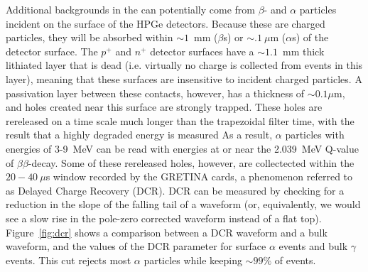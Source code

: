 \documentclass[/main.tex]{subfiles}
\begin{document}
Additional backgrounds in the \MJD can potentially come from $\beta$- and $\alpha$ particles incident on the surface of the HPGe detectors.
Because these are charged particles, they will be absorbed within $\sim1$~mm ($\beta$s) or $\sim.1~\mu$m ($\alpha$s) of the detector surface.
The $p^+$ and $n^+$ detector surfaces have a $\sim1.1$~mm thick lithiated layer that is dead (i.e. virtually no charge is collected from events in this layer), meaning that these surfaces are insensitive to incident charged particles.
A passivation layer between these contacts, however, has a thickness of $\sim0.1 \mu$m, and holes created near this surface are strongly trapped.
These holes are rereleased on a time scale much longer than the trapezoidal filter time, with the result that a highly degraded energy is measured
As a result, $\alpha$ particles with energies of 3-9~MeV can be read with energies at or near the 2.039~MeV Q-value of $\beta\beta$-decay.
Some of these rereleased holes, however, are collectected within the $20-40~\mu$s window recorded by the GRETINA cards, a phenomenon referred to as Delayed Charge Recovery (DCR).
DCR can be measured by checking for a reduction in the slope of the falling tail of a waveform (or, equivalently, we would see a slow rise in the pole-zero corrected waveform instead of a flat top).
Figure~\ref{fig:dcr} shows a comparison between a DCR waveform and a bulk waveform, and the values of the DCR parameter for surface $\alpha$ events and bulk $\gamma$ events.
This cut rejects most $\alpha$ particles while keeping $\sim99\%$ of \znbb events.
\end{document}
